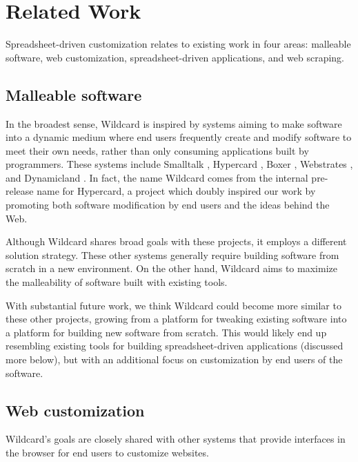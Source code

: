 \documentclass[english,submission]{programming}
\begin{document}
\hypertarget{sec:related-work}{%
\section{Related Work}\label{sec:related-work}}

Spreadsheet-driven customization relates to existing work in four areas:
malleable software, web customization, spreadsheet-driven applications,
and web scraping.

\hypertarget{malleable-software}{%
\subsection{Malleable software}\label{malleable-software}}

In the broadest sense, Wildcard is inspired by systems aiming to make
software into a dynamic medium where end users frequently create and
modify software to meet their own needs, rather than only consuming
applications built by programmers. These systems include Smalltalk
\autocite{kay1977}, Hypercard \autocite{hypercard2019}, Boxer
\autocite{disessa1986}, Webstrates \autocite{klokmose2015}, and
Dynamicland \autocite{victor}. In fact, the name Wildcard comes from the
internal pre-release name for Hypercard, a project which doubly inspired
our work by promoting both software modification by end users and the
ideas behind the Web.

Although Wildcard shares broad goals with these projects, it employs a
different solution strategy. These other systems generally require
building software from scratch in a new environment. On the other hand,
Wildcard aims to maximize the malleability of software built with
existing tools.

With substantial future work, we think Wildcard could become more
similar to these other projects, growing from a platform for tweaking
existing software into a platform for building new software from
scratch. This would likely end up resembling existing tools for building
spreadsheet-driven applications (discussed more below), but with an
additional focus on customization by end users of the software.

\hypertarget{web-customization}{%
\subsection{Web customization}\label{web-customization}}

Wildcard's goals are closely shared with other systems that provide
interfaces in the browser for end users to customize websites.
\end{document}
